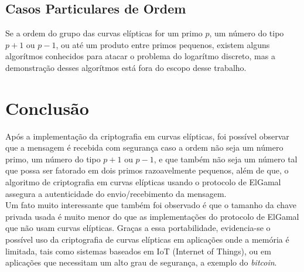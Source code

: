 \documentclass[14pt, oneside]{book}
\newcommand\tab[1][1cm]{\hspace*{#1}}
\theoremstyle{definition}
\begin{document}
            \section{Casos Particulares de Ordem}
                Se a ordem do grupo das curvas elípticas for um primo $p$, um número do tipo $p+1$ ou $p-1$, ou até um produto entre primos pequenos, existem alguns algorítmos conhecidos para atacar o problema do logarítmo discreto, mas a demonstração desses algorítmos está fora do escopo desse trabalho.
        \chapter{Conclusão}
            \tab Após a implementação da criptografia em curvas elípticas, foi possível observar que a mensagem é recebida com segurança caso a ordem não seja um número primo, um número do tipo $p+1$ ou $p-1$, e que também não seja um número tal que possa ser fatorado em dois primos razoavelmente pequenos, além de que, o algoritmo de criptografia em curvas elípticas usando o protocolo de ElGamal assegura a autenticidade do envio/recebimento da mensagem. \\
            \tab Um fato muito interessante que também foi observado é que o tamanho da chave privada usada é muito menor do que as implementações do protocolo de ElGamal que não usam curvas elípticas. Graças a essa portabilidade, evidencia-se o possível uso da criptografia de curvas elípticas em aplicações onde a memória é limitada, tais como sistemas baseados em IoT (Internet of Things), ou em aplicações que necessitam um alto grau de segurança, a exemplo do \textit{bitcoin}.
            
\end{document}
